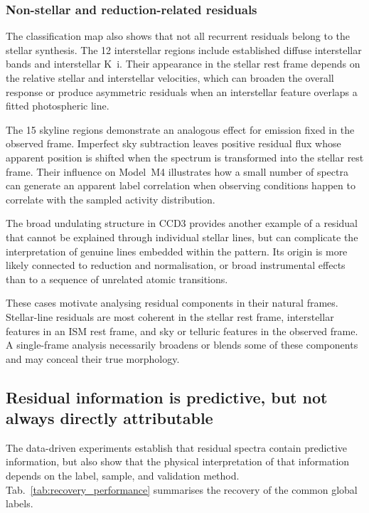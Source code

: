 \documentclass[twocolumn,apj,numberedappendix,appendixfloats]{openjournal}
\begin{document}
\subsubsection{Non-stellar and reduction-related residuals}

The classification map also shows that not all recurrent residuals belong to the stellar synthesis. The 12 interstellar regions include established diffuse interstellar bands and interstellar K~{\sc i}. Their appearance in the stellar rest frame depends on the relative stellar and interstellar velocities, which can broaden the overall response or produce asymmetric residuals when an interstellar feature overlaps a fitted photospheric line.

The 15 skyline regions demonstrate an analogous effect for emission fixed in the observed frame. Imperfect sky subtraction leaves positive residual flux whose apparent position is shifted when the spectrum is transformed into the stellar rest frame. Their influence on Model~\textcolor{M4}{M4} illustrates how a small number of spectra can generate an apparent label correlation when observing conditions happen to correlate with the sampled activity distribution.

The broad undulating structure in CCD3 provides another example of a residual that cannot be explained through individual stellar lines, but can complicate the interpretation of genuine lines embedded within the pattern. Its origin is more likely connected to reduction and normalisation, or broad instrumental effects than to a sequence of unrelated atomic transitions.

These cases motivate analysing residual components in their natural frames. Stellar-line residuals are most coherent in the stellar rest frame, interstellar features in an ISM rest frame, and sky or telluric features in the observed frame. A single-frame analysis necessarily broadens or blends some of these components and may conceal their true morphology.

\subsection{Residual information is predictive, but not always directly attributable}
\label{sec:discussion_predictive_information}

The data-driven experiments establish that residual spectra contain predictive information, but also show that the physical interpretation of that information depends on the label, sample, and validation method. Tab.~\ref{tab:recovery_performance} summarises the recovery of the common global labels.
\end{document}
